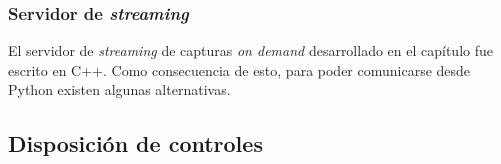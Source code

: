 \documentclass[../../main.tex]{subfiles}
\begin{document}
\subsubsection{Servidor de \textit{streaming}}
El servidor de \textit{streaming} de capturas \textit{on demand} desarrollado en el capítulo  fue escrito en C++. Como consecuencia de esto, para poder comunicarse desde Python existen algunas alternativas. 


\subsection{Disposición de controles}
\end{document}
